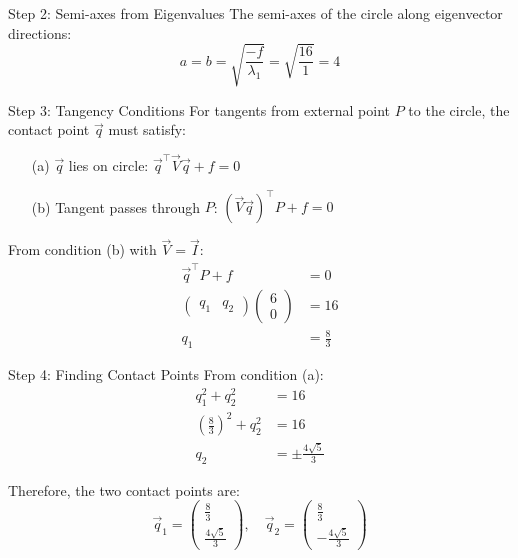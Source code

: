 \documentclass{beamer}
\newcommand{\myvec}[1]{\ensuremath{\begin{pmatrix}#1\end{pmatrix}}}
\providecommand{\brak}[1]{\ensuremath{\left(#1\right)}}
\begin{document}
	\begin{frame}{Step 2: Semi-axes from Eigenvalues}
		The semi-axes of the circle along eigenvector directions:
		\begin{equation}
			a = b = \sqrt{\frac{-f}{\lambda_1}} = \sqrt{\frac{16}{1}} = 4
		\end{equation}
		
		\vspace{1em}
	\end{frame}
	
	\begin{frame}{Step 3: Tangency Conditions}
		For tangents from external point $P$ to the circle, the contact point $\vec{q}$ must satisfy:
		\begin{enumerate}
			\item[(a)] $\vec{q}$ lies on circle: $\vec{q}^\top\vec{V}\vec{q} + f = 0$
			\item[(b)] Tangent passes through $P$: $(\vec{V}\vec{q})^\top P + f = 0$
		\end{enumerate}
		
		\vspace{1em}
		From condition (b) with $\vec{V} = \vec{I}$:
		\begin{align}
			\vec{q}^\top P + f &= 0\\
			\myvec{q_1 & q_2}\myvec{6\\0} &= 16\\
			q_1 &= \frac{8}{3}
		\end{align}
	\end{frame}
	
	\begin{frame}{Step 4: Finding Contact Points}
		From condition (a):
		\begin{align}
			q_1^2 + q_2^2 &= 16\\
			\brak{\frac{8}{3}}^2 + q_2^2 &= 16\\
			q_2 &= \pm\frac{4\sqrt{5}}{3}
		\end{align}
		
		Therefore, the two contact points are:
		\begin{equation}
			\vec{q}_1 = \myvec{\frac{8}{3}\\\frac{4\sqrt{5}}{3}}, \quad \vec{q}_2 = \myvec{\frac{8}{3}\\-\frac{4\sqrt{5}}{3}}
		\end{equation}
	\end{frame}
	
\end{document}
